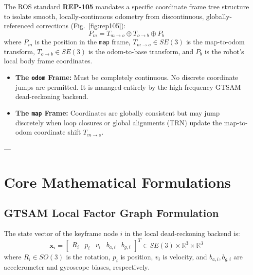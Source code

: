 \documentclass[10pt,journal,compsoc]{IEEEtran}
\begin{document}
The ROS standard \textbf{REP-105} mandates a specific coordinate frame tree structure to isolate smooth, locally-continuous odometry from discontinuous, globally-referenced corrections (Fig.~\ref{fig:rep105}):
\begin{equation}
    P_m = T_{m \to o} \oplus T_{o \to b} \oplus P_b
\end{equation}
where $P_m$ is the position in the \texttt{map} frame, $T_{m \to o} \in SE(3)$ is the map-to-odom transform, $T_{o \to b} \in SE(3)$ is the odom-to-base transform, and $P_b$ is the robot's local body frame coordinates.
\begin{itemize}
    \item \textbf{The \texttt{odom} Frame:} Must be completely continuous. No discrete coordinate jumps are permitted. It is managed entirely by the high-frequency GTSAM dead-reckoning backend.
    \item \textbf{The \texttt{map} Frame:} Coordinates are globally consistent but may jump discretely when loop closures or global alignments (TRN) update the map-to-odom coordinate shift $T_{m \to o}$.
\end{itemize}

---

\section{Core Mathematical Formulations}

\subsection{GTSAM Local Factor Graph Formulation}
The state vector of the keyframe node $i$ in the local dead-reckoning backend is:
\begin{equation}
    \mathbf{x}_i = \begin{bmatrix} R_i & p_i & v_i & b_{a,i} & b_{g,i} \end{bmatrix}^T \in SE(3) \times \mathbb{R}^3 \times \mathbb{R}^3
\end{equation}
where $R_i \in SO(3)$ is the rotation, $p_i$ is position, $v_i$ is velocity, and $b_{a,i}, b_{g,i}$ are accelerometer and gyroscope biases, respectively.
\end{document}
